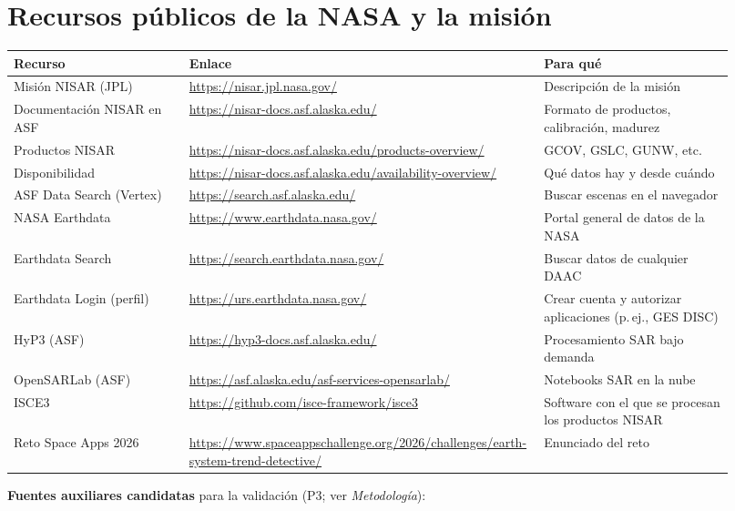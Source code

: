 \documentclass[11pt,a4paper]{article}
\begin{document}
\section{Recursos públicos de la NASA y la misión}

\begin{longtable}{p{0.24\linewidth}p{0.42\linewidth}p{0.26\linewidth}}
\toprule
\textbf{Recurso} & \textbf{Enlace} & \textbf{Para qué} \\
\midrule
\endhead
Misión NISAR (JPL) & \url{https://nisar.jpl.nasa.gov/} & Descripción de la misión \\
Documentación NISAR en ASF & \url{https://nisar-docs.asf.alaska.edu/} & Formato de productos, calibración, madurez \\
Productos NISAR & \url{https://nisar-docs.asf.alaska.edu/products-overview/} & GCOV, GSLC, GUNW, etc. \\
Disponibilidad & \url{https://nisar-docs.asf.alaska.edu/availability-overview/} & Qué datos hay y desde cuándo \\
ASF Data Search (Vertex) & \url{https://search.asf.alaska.edu/} & Buscar escenas en el navegador \\
NASA Earthdata & \url{https://www.earthdata.nasa.gov/} & Portal general de datos de la NASA \\
Earthdata Search & \url{https://search.earthdata.nasa.gov/} & Buscar datos de cualquier DAAC \\
Earthdata Login (perfil) & \url{https://urs.earthdata.nasa.gov/} & Crear cuenta y autorizar aplicaciones (p.\,ej., GES DISC) \\
HyP3 (ASF) & \url{https://hyp3-docs.asf.alaska.edu/} & Procesamiento SAR bajo demanda \\
OpenSARLab (ASF) & \url{https://asf.alaska.edu/asf-services-opensarlab/} & Notebooks SAR en la nube \\
ISCE3 & \url{https://github.com/isce-framework/isce3} & Software con el que se procesan los productos NISAR \\
Reto Space Apps 2026 & \url{https://www.spaceappschallenge.org/2026/challenges/earth-system-trend-detective/} & Enunciado del reto \\
\bottomrule
\end{longtable}

\textbf{Fuentes auxiliares candidatas} para la validación (P3; ver \emph{Metodología}):
\end{document}
